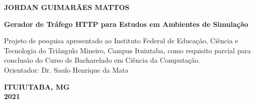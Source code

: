 \newpage
\thispagestyle{empty}

\begin{center}
\textbf{JORDAN GUIMARÃES MATTOS}

\vspace*{3 cm}

\textbf{Gerador de Tráfego HTTP para Estudos em Ambientes de Simulação}
\end{center}

\vspace*{3 cm}

\hfill
\begin{minipage}{8cm}
Projeto de pesquisa apresentado ao Instituto Federal de Educação, Ciência e Tecnologia do Triângulo Mineiro, Campus Ituiutaba, como requisito parcial para conclusão do Curso de Bacharelado em Ciência da Computação.\\

Orientador: Dr. Saulo Henrique da Mata\\
\end{minipage}

\vspace*{8.5 cm}

\begin{center}
\textbf{ITUIUTABA, MG\\2021}
\end{center}